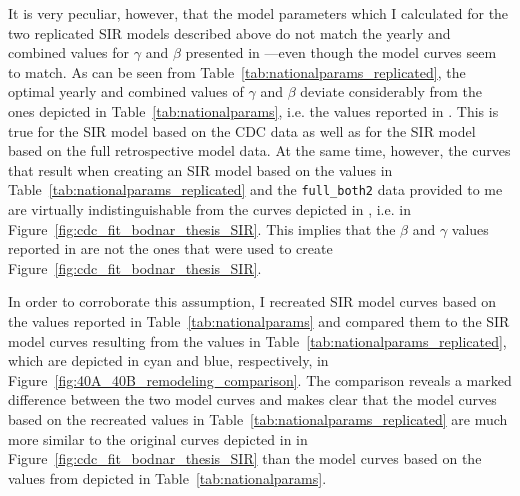 \documentclass[11pt, a4paper,twoside]{report}\usepackage[]{graphicx}\usepackage[]{color}
\begin{document}
It is very peculiar, however, that the model parameters which I calculated for the two replicated SIR models described above do not match the yearly and combined values for $\gamma$ and $\beta$ presented in \citep{bodnar_data_2015}---even though the model curves seem to match. As can be seen from Table~\ref{tab:nationalparams_replicated}, the optimal yearly and combined values of $\gamma$ and $\beta$ deviate considerably from the ones depicted in Table~\ref{tab:nationalparams}, i.e. the values reported in \citep{bodnar_data_2015}. This is true for the SIR model based on the CDC data as well as for the SIR model based on the full retrospective model data. At the same time, however, the curves that result when creating an SIR model based on the values in Table~\ref{tab:nationalparams_replicated} and the \texttt{full\_both2} data provided to me are virtually indistinguishable from the curves depicted in \cite{bodnar_data_2015}, i.e. in Figure~\ref{fig:cdc_fit_bodnar_thesis_SIR}. This implies that the $\beta$ and $\gamma$ values reported in \cite{bodnar_data_2015} are not the ones that were used to create Figure~\ref{fig:cdc_fit_bodnar_thesis_SIR}.

In order to corroborate this assumption, I recreated SIR model curves based on the values reported in Table~\ref{tab:nationalparams} and compared them to the SIR model curves resulting from the values in Table~\ref{tab:nationalparams_replicated}, which are depicted in cyan and blue, respectively, in Figure~\ref{fig:40A_40B_remodeling_comparison}. The comparison reveals a marked difference between the two model curves and makes clear that the model curves based on the recreated values in Table~\ref{tab:nationalparams_replicated} are much more similar to the original curves depicted in in Figure~\ref{fig:cdc_fit_bodnar_thesis_SIR} than the model curves based on the values from \cite{bodnar_data_2015} depicted in Table~\ref{tab:nationalparams}.\clearpage
\end{document}
